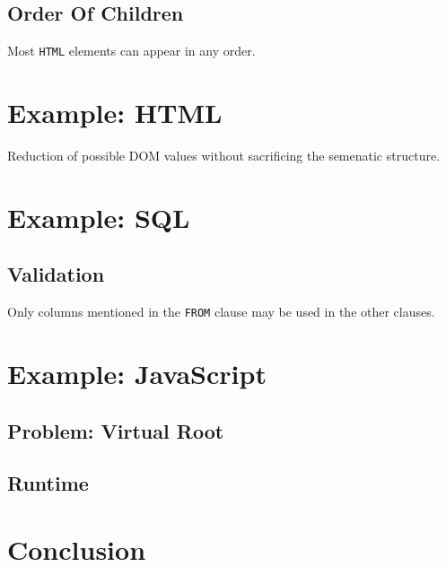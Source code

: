 \documentclass[sigconf,review=true]{acmart}
\begin{document}
\subsection{Order Of Children}

Most \texttt{HTML} elements can appear in any order.

\section{Example: HTML}

Reduction of possible DOM values without sacrificing the semenatic structure.

\section{Example: SQL}

\subsection{Validation}

Only columns mentioned in the \texttt{FROM} clause may be used in the other clauses.

\section{Example: JavaScript}

\subsection{Problem: Virtual Root}

\subsection{Runtime}

\section{Conclusion}
\end{document}
